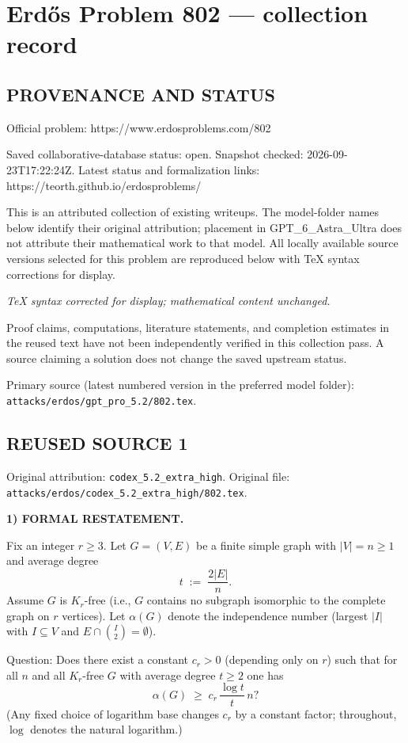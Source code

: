 \section*{Erd\H{o}s Problem 802 --- collection record}

\subsection*{PROVENANCE AND STATUS}
Official problem: https://www.erdosproblems.com/802

Saved collaborative-database status: open.
Snapshot checked: 2026-09-23T17:22:24Z.
Latest status and formalization links: https://teorth.github.io/erdosproblems/

This is an attributed collection of existing writeups. The model-folder names below identify their original attribution; placement in GPT\_6\_Astra\_Ultra does not attribute their mathematical work to that model. All locally available source versions selected for this problem are reproduced below with TeX syntax corrections for display.

\emph{TeX syntax corrected for display; mathematical content unchanged.}

Proof claims, computations, literature statements, and completion estimates in the reused text have not been independently verified in this collection pass. A source claiming a solution does not change the saved upstream status.

Primary source (latest numbered version in the preferred model folder): \texttt{attacks/erdos/gpt\_pro\_5.2/802.tex}.

\subsection*{REUSED SOURCE 1}
Original attribution: \texttt{codex\_5.2\_extra\_high}.
Original file: \texttt{attacks/erdos/codex\_5.2\_extra\_high/802.tex}.


\noindent\textbf{1) FORMAL RESTATEMENT.}

Fix an integer $r\ge 3$. Let $G=(V,E)$ be a finite simple graph with $|V|=n\ge 1$ and average degree
\[
 t\;:=\;\frac{2|E|}{n}.
\]
Assume $G$ is $K_r$-free (i.e., $G$ contains no subgraph isomorphic to the complete graph on $r$ vertices).
Let $\alpha(G)$ denote the independence number (largest $|I|$ with $I\subseteq V$ and $E\cap\binom{I}{2}=\emptyset$).

Question: Does there exist a constant $c_r>0$ (depending only on $r$) such that for all $n$ and all $K_r$-free $G$ with average degree $t\ge 2$ one has
\[
\alpha(G)\;\ge\; c_r\,\frac{\log t}{t}\,n?
\]
(Any fixed choice of logarithm base changes $c_r$ by a constant factor; throughout, $\log$ denotes the natural logarithm.)

